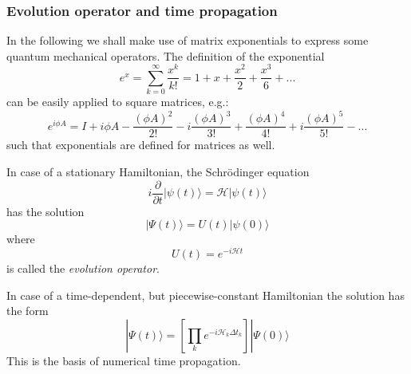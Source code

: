 \documentclass[11.5pt,a4paper]{article}
\begin{document}
\subsubsection{Evolution operator and time propagation}
In the following we shall make use of matrix exponentials to express some quantum mechanical operators. The definition of the exponential
\begin{equation}
 e^x = \sum_{k=0}^\infty \frac{x^k}{k!} = 1 + x + \frac{x^2}{2} + \frac{x^3}{6} + ...
\end{equation}
can be easily applied to square matrices, e.g.:
\begin{equation}
 e^{i \phi A } = I + i \phi A - \frac{(\phi A)^2}{2!} - i \frac{(\phi A)^3}{3!} + \frac{(\phi A)^4}{4!} + i \frac{(\phi A)^5}{5!} - ...
\end{equation}
such that exponentials are defined for matrices as well.

\label{sec-dynamics}
In case of a stationary Hamiltonian, the Schr\"odinger equation 
\begin{equation}
  i \frac{\partial}{\partial t} | \psi(t) \rangle = \mathcal{H} |\psi(t) \rangle
\end{equation}
has the solution
\begin{equation}
  |\Psi(t)\rangle = U(t) | \psi(0) \rangle
  \label{eq-psi-general-solution}
\end{equation}
where 
\begin{equation}
 U(t) = e^{-i \mathcal{H} t}
  \label{eq-evolution}
\end{equation}
is called the \emph{evolution operator}.

In case of a time-dependent, but piecewise-constant Hamiltonian the solution has the form
\begin{equation}
 |\Psi(t)\rangle = \left[ \prod_k e^{-i\mathcal{H}_k \Delta t_k} \right] |\Psi(0)\rangle
  \label{eq-time-propagation}
\end{equation}
This is the basis of numerical time propagation.
\end{document}
